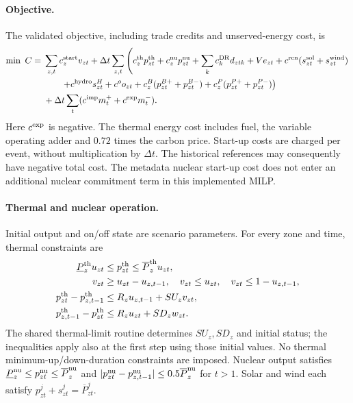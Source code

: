 \paragraph{Objective.}
The validated objective, including trade credits and unserved-energy cost, is
\begin{align}
 \min\ C={}&\sum_{z,t} c^{\rm start}_zv_{zt}
 +\Delta t\sum_{z,t}\left(c^{\rm th}_zp^{\rm th}_{zt}
 +c^{\rm nu}_zp^{\rm nu}_{zt}+\sum_k c^{\rm DR}_kd_{ztk}
 +V e_{zt}+c^{\rm ren}(s^{\rm sol}_{zt}+s^{\rm wind}_{zt})\right.\nonumber\\
 &\left.\qquad+c^{\rm hydro}s^H_{zt}+c^o o_{zt}
 +c^B_z(p^{B+}_{zt}+p^{B-}_{zt})
 +c^P_z(p^{P+}_{zt}+p^{P-}_{zt})\right)\nonumber\\
 &+\Delta t\sum_t(c^{\rm imp}m^+_t+c^{\rm exp}m^-_t).
\end{align}
Here $c^{\rm exp}$ is negative. The thermal energy cost includes fuel,
the variable operating adder and $0.72$ times the carbon price.
Start-up costs are charged per event, without multiplication by $\Delta t$.
The historical references may consequently have negative total cost.
The metadata nuclear start-up cost does not enter an additional nuclear
commitment term in this implemented MILP.

\paragraph{Thermal and nuclear operation.}
Initial output and on/off state are scenario parameters. For every zone and
time, thermal constraints are
\begin{align}
 \underline P^{\rm th}_zu_{zt}&\le p^{\rm th}_{zt}\le\overline P^{\rm th}_zu_{zt},\\
 v_{zt}&\ge u_{zt}-u_{z,t-1},\quad
 v_{zt}\le u_{zt},\quad v_{zt}\le1-u_{z,t-1},\\
 p^{\rm th}_{zt}-p^{\rm th}_{z,t-1}
 &\le R_zu_{z,t-1}+SU_zv_{zt},\\
 p^{\rm th}_{z,t-1}-p^{\rm th}_{zt}
 &\le R_zu_{zt}+SD_zw_{zt}.
\end{align}
The shared thermal-limit routine determines $SU_z,SD_z$ and initial status;
the inequalities apply also at the first step using those initial values.
No thermal minimum-up/down-duration constraints are imposed. Nuclear output
satisfies $\underline P^{\rm nu}_z\le p^{\rm nu}_{zt}\le\overline P^{\rm nu}_z$
and $|p^{\rm nu}_{zt}-p^{\rm nu}_{z,t-1}|\le0.5\overline P^{\rm nu}_z$ for
$t>1$. Solar and wind each satisfy $p^{j}_{zt}+s^{j}_{zt}=\overline P^j_{zt}$.

